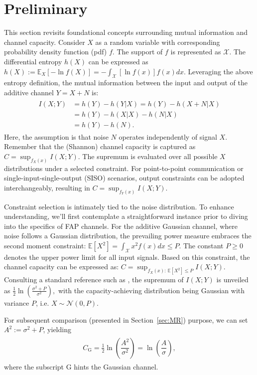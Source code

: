 \documentclass[conference]{IEEEtran}
\newcommand{\E}{\mathbb{E}}
\theoremstyle{definition}
\theoremstyle{plain}
\begin{document}
\section{Preliminary} \label{pre-A}
\color{black}
This section revisits foundational concepts surrounding mutual information and channel capacity. Consider \(X\) as a random variable with corresponding probability density function (pdf) \(f\). The support of \(f\) is represented as \(\mathcal{X}\). The differential entropy \(h(X)\) can be expressed as
$
h(X) := \E_X[-\ln f(X)] = -\int_{\mathcal{X}}  [\ln f(x)] f(x)dx.
$
Leveraging the above entropy definition, the mutual information between the input and output of the additive channel \(Y = X + N\) is:
\begin{align}
\begin{split}
    I(X;Y) &= h(Y) - h(Y|X)
    = h(Y) - h(X+N|X) \\
    &= h(Y) - h(X|X) - h(N|X) \\
    &= h(Y) - h(N).
\end{split}
\end{align}
Here, the assumption is that noise \(N\) operates independently of signal \(X\).
Remember that the (Shannon) channel capacity is captured as
$
C = \sup_{f_X(x)} I(X;Y).
\label{eq:inpc}
$
The supremum is evaluated over all possible \(X\) distributions under a selected constraint. For point-to-point communication or single-input-single-output (SISO) scenarios, output constraints can be adopted interchangeably, resulting in
$
C = \sup_{f_Y(x)} I(X;Y).
\label{eq:outpc}
$

Constraint selection is intimately tied to the noise distribution. To enhance understanding, we'll first contemplate a straightforward instance prior to diving into the specifics of FAP channels. For the additive Gaussian channel, where noise follows a Gaussian distribution, the prevailing power measure embraces the second moment constraint:
$
    \E[X^2] = \int_{\mathcal{X}} x^2 f(x)dx \leq P.
$
The constant \(P \geq 0\) denotes the upper power limit for all input signals. Based on this constraint, the channel capacity can be expressed as:
$
C = \sup_{f_X(x) :\  \E[X^2]\leq P} I(X;Y).
$
Consulting a standard reference such as \cite{cover1999elements}, the supremum of \(I(X;Y)\) is unveiled as
$
\frac{1}{2}\ln\left(\frac{\sigma^2+P}{\sigma^2}\right),
$
with the capacity-achieving distribution being Gaussian with variance \(P\), i.e. \(X \sim \mathcal{N}(0,P)\).

For subsequent comparison (presented in Section~\ref{sec:MR}) purpose, we can set \(A^2:=\sigma^2+P\), yielding
\begin{align}
\begin{split}
C_{\text{G}}
=\frac{1}{2}\ln\left(\dfrac{A^2}{\sigma^2}\right)
=\ln\left(\dfrac{A}{\sigma}\right),
\end{split}
\end{align}
where the subscript \(\text{G}\) hints the Gaussian channel.
\color{black}
\end{document}
